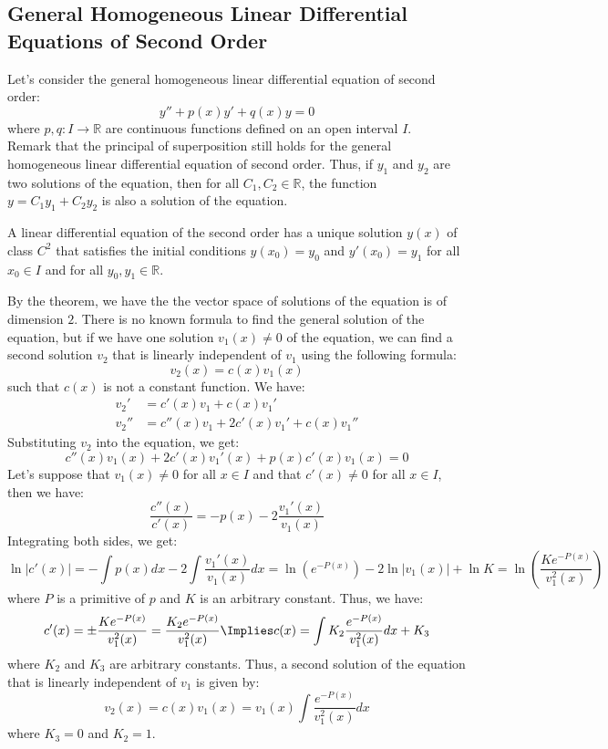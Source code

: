\subsection{General Homogeneous Linear Differential Equations of Second Order}
Let's consider the general homogeneous linear differential equation of second order:
\[
    y'' + p(x) y' + q(x) y = 0
\]
where $p, q: I \to \mathbb{R}$ are continuous functions defined on an open interval $I$. \\
Remark that the principal of superposition still holds for the general homogeneous linear differential equation of second order. Thus, if $y_1$ and $y_2$ are two solutions of the equation, then for all $C_1, C_2 \in \mathbb{R}$, the function $y = C_1 y_1 + C_2 y_2$ is also a solution of the equation.
\begin{theorem}
    A linear differential equation of the second order has a unique solution $y(x)$ of class $C^2$ that satisfies the initial conditions $y(x_0) = y_0$ and $y'(x_0) = y_1$ for all $x_0 \in I$ and for all $y_0, y_1 \in \mathbb{R}$.
\end{theorem}
By the theorem, we have the the vector space of solutions of the equation is of dimension $2$. There is no known formula to find the general solution of the equation, but if we have one solution $v_1(x) \neq 0$ of the equation, we can find a second solution $v_2$ that is linearly independent of $v_1$ using the following formula:
\[
    v_2(x) = c(x) v_1(x)
\]
such that $c(x)$ is not a constant function. We have:
\begin{align*}
    v_2' & = c'(x) v_1 + c(x) v_1' \\
    v_2'' & = c''(x) v_1 + 2 c'(x) v_1' + c(x) v_1''
\end{align*}
Substituting $v_2$ into the equation, we get:
\[
    c''(x) v_1(x) + 2c'(x) v_1'(x) + p(x) c'(x) v_1(x) = 0
\]
Let's suppose that $v_1(x) \neq 0$ for all $x \in I$ and that $c'(x) \neq 0$ for all $x \in I$, then we have:
\[
    \frac{c''(x)}{c'(x)} = -p(x)-2\frac{v_1'(x)}{v_1(x)}
\]
Integrating both sides, we get:
\[
    \ln |c'(x)| = -\int p(x) dx - 2\int \frac{v_1'(x)}{v_1(x)} dx = \ln (e^{-P(x)}) - 2 \ln |v_1(x)| + \ln K = \ln \left(\frac{Ke^{-P(x)}}{v_1^2(x)}\right)
\]
where $P$ is a primitive of $p$ and $K$ is an arbitrary constant. Thus, we have:
\[
    c'(x) = \pm \frac{Ke^{-P(x)}}{v_1^2(x)} = \frac{K_2e^{-P(x)}}{v_1^2(x)} \Implies c(x) =\int K_2 \frac{e^{-P(x)}}{v_1^2(x)} dx + K_3
\]
where $K_2$ and $K_3$ are arbitrary constants. Thus, a second solution of the equation that is linearly independent of $v_1$ is given by:
\[
    v_2(x) = c(x) v_1(x) = v_1(x) \int\frac{e^{-P(x)}}{v_1^2(x)} dx
\]
where $K_3 = 0$ and $K_2 = 1$.

